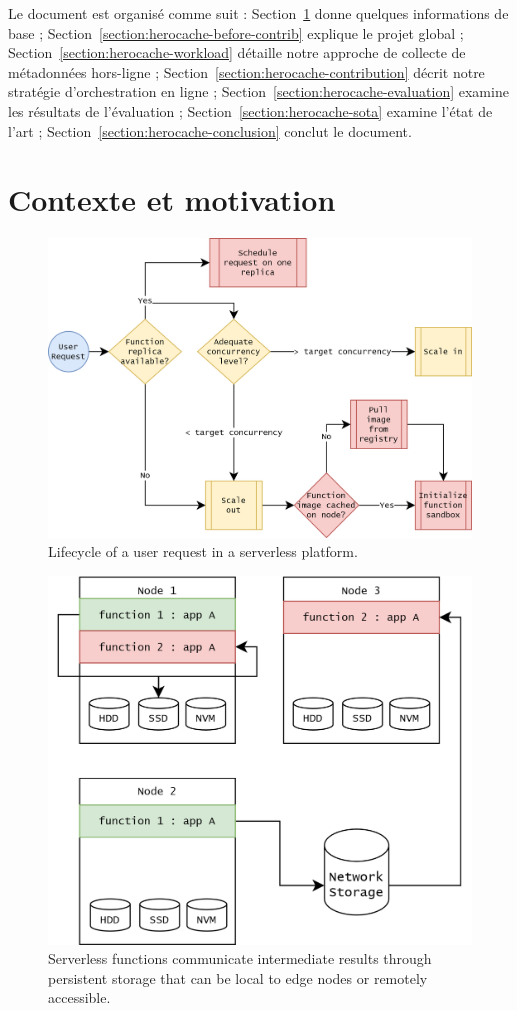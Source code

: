 Le document est organisé comme suit : Section~\ref{section:herocache-background} donne quelques informations de base ; Section~\ref{section:herocache-before-contrib} explique le projet global ; Section~\ref{section:herocache-workload} détaille notre approche de collecte de métadonnées hors-ligne ; Section~\ref{section:herocache-contribution} décrit notre stratégie d'orchestration en ligne ; Section~\ref{section:herocache-evaluation} examine les résultats de l'évaluation ; Section~\ref{section:herocache-sota} examine l'état de l'art ; Section~\ref{section:herocache-conclusion} conclut le document.

\section{Contexte et motivation}
\label{section:herocache-background}

\begin{figure}[t]
\centering
\includegraphics[width=0.8\columnwidth]{6_Chapitre4/figures/function-cache.png}
\caption{Lifecycle of a user request in a serverless platform.}
\label{figure:herocache-function-cache}
\end{figure}

\begin{figure}[t]
\centering
\includegraphics[width=0.8\columnwidth]{6_Chapitre4/figures/function-communications.png}
\caption{Serverless functions communicate intermediate results through persistent storage that can be local to edge nodes or remotely accessible.}
\label{figure:herocache-function-communications}
\end{figure}

